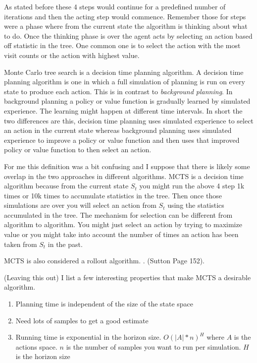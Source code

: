 As stated before these 4 steps would continue for a predefined number of iterations and then the acting step would commence. Remember those for steps were a  phase where from the current state the algorithm is thinking about what to do. Once the thinking phase is over the agent acts by selecting an action based off statistic in the tree. One common one is to select the action with the most visit counts or the action with highest value. 

Monte Carlo tree search is a decision time planning algorithm. A decision time planning algorithm is one in which a full simulation of planning is run on every state to produce each action. This is in contrast to \textit{background planning}. In background planning a policy or value function is gradually learned by simulated experience. The learning might happen at different time intervals. In short the two differences are this, decision time planning uses simulated experience to select an action in the current state whereas background planning uses simulated experience to improve a policy or value function and then uses that improved policy or value function to then select an action. 

For me this definition was a bit confusing and I suppose that there is likely some overlap in the two approaches in different algorithms. MCTS is a decision time algorithm because from the current state $S_t$ you might run the above 4 step 1k times or 10k times to accumulate statistics in the tree. Then once those simulations are over you will select an action from $S_t$ using the statistics accumulated in the tree. The mechanism for selection can be different from algorithm to algorithm. You might just select an action by trying to maximize value or you might take into account the number of times an action has been taken from $S_t$ in the past.

MCTS is also considered a rollout algorithm. .
(Sutton Page 152). 

(Leaving this out)
I list a few interesting properties that make MCTS a desirable algorithm.
\begin{enumerate}
    \item Planning time is independent of the size of the state space
    \item Need lots of samples to get a good estimate
    \item Running time is exponential in the horizon size. $O(|A|*n)^{H}$ where $A$ is the actions space. $n$ is the number of samples you want to run per simulation. $H$ is the horizon size
\end{enumerate}

